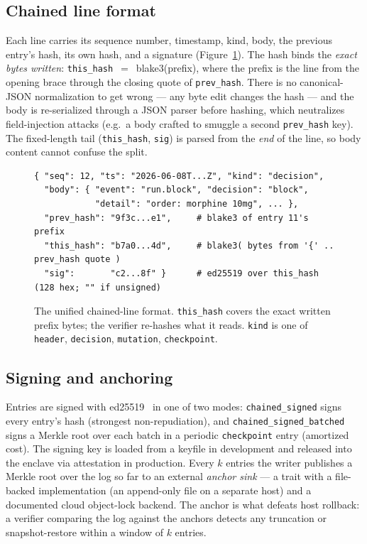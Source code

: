 \documentclass[11pt]{article}
\begin{document}
\subsection{Chained line format}\label{sec:format}
Each line carries its sequence number, timestamp, kind, body, the previous entry's
hash, its own hash, and a signature (Figure~\ref{fig:format}). The hash binds the
\emph{exact bytes written}: \texttt{this\_hash}~$=$~\textsf{blake3}(prefix), where
the prefix is the line from the opening brace through the closing quote of
\texttt{prev\_hash}. There is no canonical-JSON normalization to get wrong --- any
byte edit changes the hash --- and the body is re-serialized through a JSON parser
before hashing, which neutralizes field-injection attacks (e.g.\ a body crafted to
smuggle a second \texttt{prev\_hash} key). The fixed-length tail
(\texttt{this\_hash}, \texttt{sig}) is parsed from the \emph{end} of the line, so
body content cannot confuse the split.

\begin{figure}[htb]\centering
\begin{tcolorbox}[policycard, cardcol=cardteal, title=One chained audit line (kind: decision),
  width=0.93\linewidth]
\begin{lstlisting}[style=housespecyamlbare]
{ "seq": 12, "ts": "2026-06-08T...Z", "kind": "decision",
  "body": { "event": "run.block", "decision": "block",
            "detail": "order: morphine 10mg", ... },
  "prev_hash": "9f3c...e1",     # blake3 of entry 11's prefix
  "this_hash": "b7a0...4d",     # blake3( bytes from '{' .. prev_hash quote )
  "sig":       "c2...8f" }      # ed25519 over this_hash (128 hex; "" if unsigned)
\end{lstlisting}
\end{tcolorbox}
\caption{The unified chained-line format. \texttt{this\_hash} covers the exact
written prefix bytes; the verifier re-hashes what it reads. \texttt{kind} is one of
\texttt{header}, \texttt{decision}, \texttt{mutation}, \texttt{checkpoint}.}
\label{fig:format}
\end{figure}

\subsection{Signing and anchoring}
Entries are signed with ed25519~\cite{ed25519} in one of two modes:
\texttt{chained\_signed} signs every entry's hash (strongest non-repudiation), and
\texttt{chained\_signed\_batched} signs a Merkle root over each batch in a periodic
\texttt{checkpoint} entry (amortized cost). The signing key is loaded from a keyfile
in development and released into the enclave via attestation in production. Every
$k$ entries the writer publishes a Merkle root over the log so far to an external
\emph{anchor sink} --- a trait with a file-backed implementation (an append-only
file on a separate host) and a documented cloud object-lock backend. The anchor is
what defeats host rollback: a verifier comparing the log against the anchors detects
any truncation or snapshot-restore within a window of $k$ entries.
\end{document}
